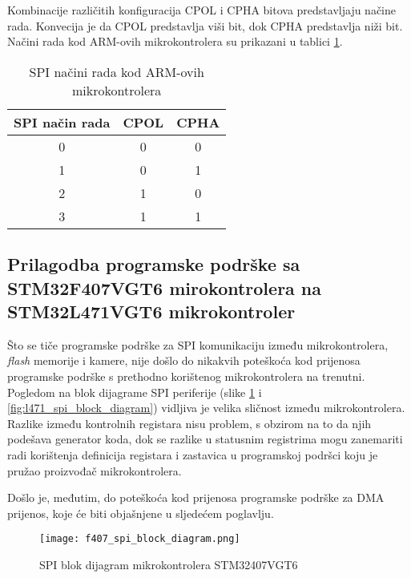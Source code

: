 Kombinacije različitih konfiguracija CPOL i CPHA bitova predstavljaju načine rada. Konvecija je da CPOL predstavlja viši bit, dok CPHA predstavlja niži bit. Načini rada kod ARM-ovih mikrokontrolera su prikazani u tablici \ref{Tab:spi_modes}.
\begin{center}
	\begin{table}[H]
		\centering
		\caption{SPI načini rada kod ARM-ovih mikrokontrolera \cite{spi_wikipedia}}
		\begin{tabular}{| c | c | c |}
			\hline
			SPI način rada & CPOL & CPHA \\
			\hline
			0 & 0 & 0 \\
			\hline
			1 & 0 & 1 \\
			\hline
			2 & 1 & 0 \\
			\hline
			3 & 1 & 1 \\
			\hline
		\end{tabular}
		\label{Tab:spi_modes}
	\end{table}
\end{center}

\subsection{Prilagodba programske podrške sa STM32F407VGT6 mirokontrolera na STM32L471VGT6 mikrokontroler}

Što se tiče programske podrške za SPI komunikaciju između mikrokontrolera, \textit{flash} memorije i kamere, nije došlo do nikakvih poteškoća kod prijenosa programske podrške s prethodno korištenog mikrokontrolera na trenutni. Pogledom na blok dijagrame SPI periferije (slike \ref{fig:f407_spi_block_diagram} i \ref{fig:l471_spi_block_diagram}) vidljiva je velika sličnost između mikrokontrolera. Razlike između kontrolnih registara nisu problem, s obzirom na to da njih podešava generator koda, dok se razlike u statusnim registrima mogu zanemariti radi korištenja definicija registara i zastavica u programskoj podršci koju je pružao proizvođač mikrokontrolera.

Došlo je, međutim, do poteškoća kod prijenosa programske podrške za DMA prijenos, koje će biti objašnjene u sljedećem poglavlju.

\begin{figure}[H]
	\centering
	\texttt{[image: f407\_spi\_block\_diagram.png]}
	\caption{SPI blok dijagram mikrokontrolera STM32407VGT6 \cite[str. 876]{f407_manual}}
	\label{fig:f407_spi_block_diagram}
\end{figure}

